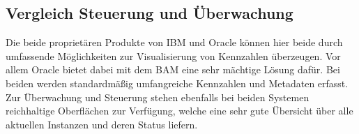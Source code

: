 

\subsection{Vergleich Steuerung und Überwachung}
\label{vergleichSteuerung}
Die beide proprietären Produkte von IBM und Oracle können hier beide durch umfassende Möglichkeiten zur Visualisierung von Kennzahlen überzeugen. Vor allem Oracle bietet dabei mit dem BAM eine sehr mächtige Lösung dafür. Bei beiden werden standardmäßig umfangreiche Kennzahlen und Metadaten erfasst. Zur Überwachung und Steuerung stehen ebenfalls bei beiden Systemen reichhaltige Oberflächen zur Verfügung, welche eine sehr gute Übersicht über alle aktuellen Instanzen und deren Status liefern. 

